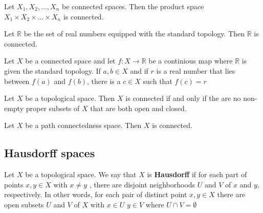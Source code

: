 \documentclass{article}
\theoremstyle{remark}
\begin{document}
\begin{theorem}
    Let $X_{1},  X_{2}, \ldots, X_{n}$ be connected spaces. Then the product space $X_{1} \times X_{2} \times  \ldots
    \times  X_{n}$ is connected.

\end{theorem}

\begin{theorem}
    Let $\mathbb{R} $ be the set of real numbers equipped with the standard topology. Then $\mathbb{R} $ is connected.

\end{theorem}

\begin{theorem}

    Let $X$ be a connected space and let $f: X \to  \mathbb{R} $ be a continious map where $ \mathbb{R} $ is given the
    standard topology.  If $a,b \in X $ and if $r$ is a real number that lies between $f\left(a  \right) $ and $f\left(
    b\right)$, there is a $c \in  X$ such that $f\left( c \right) = r$

\end{theorem}

\begin{theorem}[Connectivity]
    Let $X$ be a topological space. Then $X$ is connected if and only if the are no non-empty proper subsets of $X$ that
    are both open and closed.
\end{theorem}

\begin{theorem}
    Let $X$ be a path connectedness space. Then $X$ is connected.

\end{theorem}
\subsection{Hausdorff spaces}%
\label{sub:hausdorff_spaces}

\begin{definition}[Hausdorff]

    Let $X $ be a topological space. We say that $X$ is \textbf{Hausdorff} if for each part of points $x,y  \in X $ with
    $x\neq y$ , there are disjoint neighborhoods $U$ and $V$ of $x$ and $y$, respectively. In other words, for each pair
    of distinct point $x,y \in  X$ there are open subsets $U$ and $V$ of $X$ with $x \in U$ $y \in V $ where $U \cap V =
    \emptyset $
\end{definition}
\end{document}
